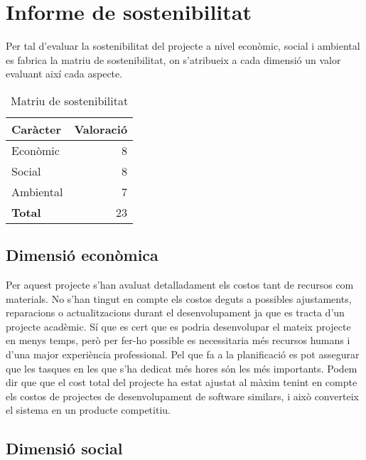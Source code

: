 
\chapter{Informe de sostenibilitat} %

\label{InformeSostenbilitat} %

Per tal d’evaluar la sostenibilitat del projecte a nivel econòmic, social i ambiental es fabrica la matriu de sostenibilitat, on s’atribueix a cada dimensió un
valor evaluant així cada aspecte.\\


\begin{table}[!h]
\begin{tabular}{|l|r|}
\hline
\textbf{Caràcter}  & \textbf{Valoració} \\\hline
Econòmic & 8 \\\hline
Social & 8 \\\hline
Ambiental & 7 \\\hline
\textbf{Total} & 23 \\\hline
\end{tabular}
\label{}
\caption{Matriu de sostenibilitat}
\end{table}

\section{Dimensió econòmica}
Per aquest projecte s’han avaluat detalladament els costos tant de recursos com
materials. No s’han tingut en compte els costos deguts a possibles ajustaments,
reparacions o actualitzacions durant el desenvolupament ja que es tracta d’un
projecte acadèmic. Sí que es cert que es podria desenvolupar el mateix projecte
en menys temps, però per fer-ho possible es necessitaria més recursos humans
i d’una major experiència professional. Pel que fa a la planificació es pot assegurar que les tasques en les que s’ha dedicat més hores són les més importants.
Podem dir que que el cost total del projecte ha estat ajustat al màxim tenint en
compte els costos de projectes de desenvolupament de software similars, i això
converteix el sistema en un producte competitiu.

\section{Dimensió social}

